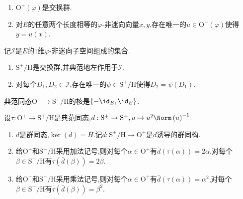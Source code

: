 \begin{corollary}{}{}
	\begin{enumerate}
		\item $\mathrm{O}^{+}\left(\varphi\right)$是交换群.
		\item 对$E$的任意两个长度相等的$\varphi$-非迷向向量$x,y$,存在唯一的$u\in\mathrm{O}^{+}\left(\varphi\right)$使得$y=u\left(x\right)$.
	\end{enumerate}
\end{corollary}

\begin{corollary}{}{}
	记$\mathcal{I}$是$E$的$1$维$\varphi$-非迷向子空间组成的集合.
	\begin{enumerate}
		\item $\mathrm{S}^{+}/\mathrm{H}$是交换群,并典范地左作用于$\mathcal{I}$.
		\item 对每个$D_{1},D_{2}\in\mathcal{I}$,存在唯一的$\psi\in\mathrm{S}^{+}/\mathrm{H}$使得$D_{2}=\psi\left(D_{1}\right)$.
	\end{enumerate}
\end{corollary}

\begin{proposition}{}{}
	典范同态$\mathrm{O}^{+}\to\mathrm{S}^{+}/\mathrm{H}$的核是$\left\{-\id_{E},\id_{E}\right\}$.
\end{proposition}

\begin{proposition}{}{}
	设$\tau:\mathrm{O}^{+}\to\mathrm{S}^{+}/\mathrm{H}$是典范同态,$d:\mathrm{S}^{+}\to\mathrm{S}^{+},u\mapsto u^{2}\Norm\left(u\right)^{-1}$.
	\begin{enumerate}
		\item $d$是群同态,$\ker\left(d\right)=H$.记$\bar{d}:\mathrm{S}^{+}/\mathrm{H}\to\mathrm{O}^{+}$是$d$诱导的群同构.
		\item 给$\mathrm{O}^{+}$和$\mathrm{S}^{+}/\mathrm{H}$采用加法记号,则对每个$\alpha\in\mathrm{O}^{+}$有$\bar{d}\left(\tau\left(\alpha\right)\right)=2\alpha$,对每个$\beta\in\mathrm{S}^{+}/\mathrm{H}$有$\tau\left(\bar{d}\left(\beta\right)\right)=2\beta$.
		\item 给$\mathrm{O}^{+}$和$\mathrm{S}^{+}/\mathrm{H}$采用乘法记号,则对每个$\alpha\in\mathrm{O}^{+}$有$\bar{d}\left(\tau\left(\alpha\right)\right)=\alpha^{2}$,对每个$\beta\in\mathrm{S}^{+}/\mathrm{H}$有$\tau\left(\bar{d}\left(\beta\right)\right)=\beta^{2}$.
	\end{enumerate}
\end{proposition}














